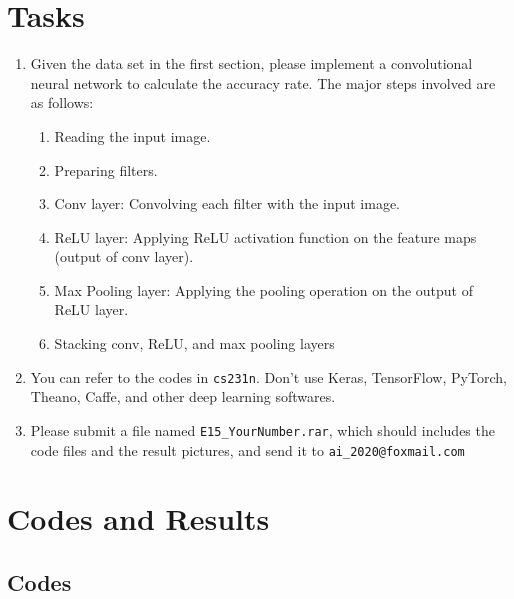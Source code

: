 \documentclass[UTF8, a4paper, 11pt]{article}
\begin{document}
\section{Tasks}
\begin{enumerate}
	\item Given the data set in the first section, please implement a convolutional neural network to calculate the accuracy rate. The major steps involved are as follows:
	\begin{enumerate}
		\item Reading the input image.
		\item Preparing filters.
		\item Conv layer: Convolving each filter with the input image.
		\item ReLU layer: Applying ReLU activation function on the feature maps (output of conv layer).
		\item Max Pooling layer: Applying the pooling operation on the output of ReLU layer.
		\item Stacking conv, ReLU, and max pooling layers
	\end{enumerate}
	\item You can refer to the codes in \texttt{cs231n}. Don't use Keras, TensorFlow, PyTorch, Theano, Caffe, and other deep learning softwares. 
	\item Please submit a file named \texttt{E15\_YourNumber.rar}, which should includes the code files and the result pictures, and send it to \texttt{ai\_2020@foxmail.com}
\end{enumerate}



\section{Codes and Results}
\subsection{Codes}

%
%
\end{document}
